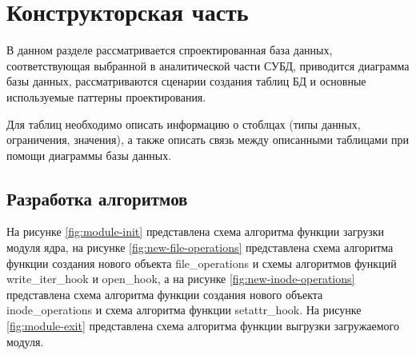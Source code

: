 \section{\large Конструкторская часть}

В  данном  разделе  рассматривается спроектированная база данных, соответствующая выбранной в  аналитической части СУБД, приводится диаграмма базы данных, рассматриваются сценарии создания таблиц БД и основные используемые паттерны проектирования.

Для таблиц необходимо описать информацию о стоблцах (типы данных, ограничения, значения), а также описать связь между описанными таблицами при помощи диаграммы базы данных.

\subsection{Разработка алгоритмов}

На рисунке \ref{fig:module-init} представлена схема алгоритма функции загрузки модуля ядра, на рисунке \ref{fig:new-file-operations} представлена схема алгоритма функции создания нового объекта file\_operations и схемы алгоритмов функций write\_iter\_hook и open\_hook, а на рисунке \ref{fig:new-inode-operations} представлена схема алгоритма функции создания нового объекта inode\_operations и схема алгоритма функции setattr\_hook. 
На рисунке \ref{fig:module-exit} представлена схема алгоритма функции выгрузки загружаемого модуля.

